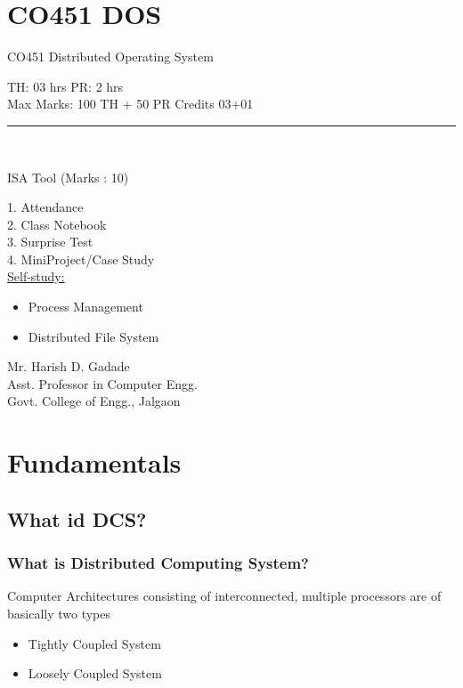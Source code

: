 \documentclass{beamer}
\author[Govt. Colleg of Engg, Jalgaon]{}
\begin{document}
   


\section{CO451 DOS}
\begin{frame}

\begin{center}
\huge CO451 Distributed Operating System\\
\end{center}
TH: 03 hrs
\hspace{5cm}
PR: 2 hrs\\
Max Marks: 100 TH + 50 PR
\hspace{2cm}
Credits 03+01\\
\noindent\rule{10.5cm}{0.4pt}\\
\begin{center}
ISA Tool (Marks : 10)\\
\end{center}
\hspace{2cm}1. Attendance\\
\hspace{2cm}2. Class Notebook\\
\hspace{2cm}3. Surprise Test\\
\hspace{2cm}4. MiniProject/Case Study\\
\underline{Self-study:}
\begin{itemize}
	\item Process Management
	\item Distributed File System
\end{itemize}
\hspace{6cm}Mr. Harish D. Gadade\\
\hspace{5cm}Asst. Professor in Computer Engg.\\
\hspace{5.2cm}Govt. College of Engg., Jalgaon
\end{frame} 



\section{Fundamentals}
\subsection{What id DCS?}
    \begin{frame}
        \frametitle{What is Distributed Computing System?}
            Computer Architectures consisting of interconnected, multiple processors are of basically two types
        \vspace{0.02cm}
        \begin{itemize}
        	\item Tightly Coupled System
            \item Loosely Coupled System
        \end{itemize}
        \vspace{5cm}
    \end{frame}
\end{document}
